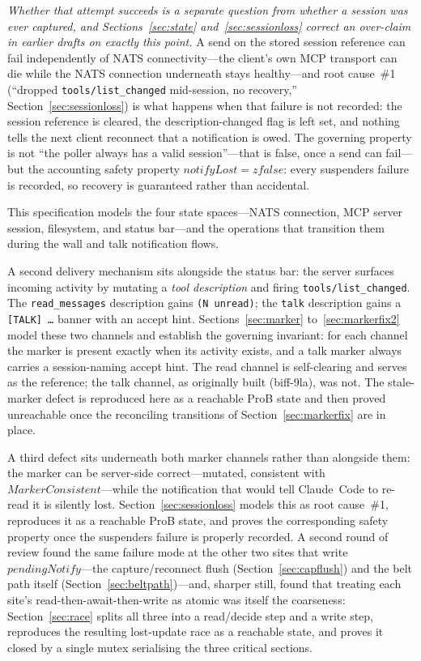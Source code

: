 \documentclass[a4paper,10pt,fleqn]{article}
\begin{document}
\emph{Whether that attempt succeeds is a separate question from
whether a session was ever captured, and Sections~\ref{sec:state}
and~\ref{sec:sessionloss} correct an over-claim in earlier drafts on
exactly this point.}  A send on the stored session reference can fail
independently of NATS connectivity---the client's own MCP transport
can die while the NATS connection underneath stays healthy---and
root cause~\#1 (``dropped \texttt{tools/list\_changed} mid-session, no
recovery,'' Section~\ref{sec:sessionloss}) is what happens when that
failure is not recorded: the session reference is cleared, the
description-changed flag is left set, and nothing tells the next
client reconnect that a notification is owed.  The governing property
is not ``the poller always has a valid session''---that is false, once
a send can fail---but the accounting safety property $notifyLost =
zfalse$: every suspenders failure is recorded, so recovery is
guaranteed rather than accidental.

This specification models the four state spaces---NATS connection,
MCP server session, filesystem, and status bar---and the operations
that transition them during the wall and talk notification flows.

A second delivery mechanism sits alongside the status bar: the server
surfaces incoming activity by mutating a \emph{tool description} and
firing \texttt{tools/list\_changed}.  The \texttt{read\_messages}
description gains \texttt{(N unread)}; the \texttt{talk} description gains
a \texttt{[TALK] \ldots} banner with an accept hint.
Sections~\ref{sec:marker} to~\ref{sec:markerfix2} model these two
channels and establish the governing invariant: for each channel the
marker is present exactly when its activity exists, and a talk marker
always carries a session-naming accept hint.  The read channel is
self-clearing and serves as the reference; the talk channel, as
originally built (biff-9la), was not.  The stale-marker defect is
reproduced here as a reachable ProB state and then proved unreachable
once the reconciling transitions of Section~\ref{sec:markerfix} are in
place.

A third defect sits underneath both marker channels rather than
alongside them: the marker can be server-side correct---mutated,
consistent with $MarkerConsistent$---while the notification that would
tell Claude~Code to re-read it is silently lost.
Section~\ref{sec:sessionloss} models this as root cause~\#1, reproduces
it as a reachable ProB state, and proves the corresponding safety
property once the suspenders failure is properly recorded.  A second
round of review found the same failure mode at the other two sites
that write $pendingNotify$---the capture/reconnect flush
(Section~\ref{sec:capflush}) and the belt path itself
(Section~\ref{sec:beltpath})---and, sharper still, found that treating
each site's read-then-await-then-write as atomic was itself the
coarseness: Section~\ref{sec:race} splits all three into a read/decide
step and a write step, reproduces the resulting lost-update race as a
reachable state, and proves it closed by a single mutex serialising the
three critical sections.
\end{document}
